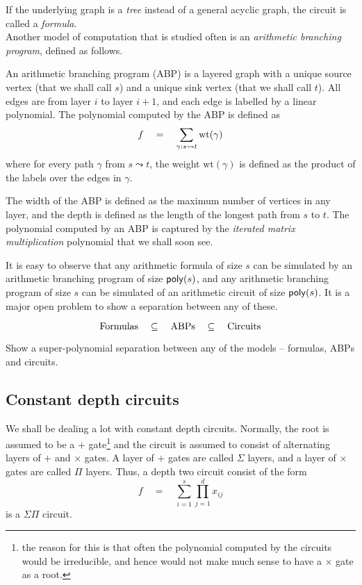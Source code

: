 If the underlying graph is a \emph{tree} instead of a general acyclic graph, the circuit is called a \emph{formula}. \\

Another model of computation that is studied often is an \emph{arithmetic branching program}, defined as follows. 

\begin{definition}\label{defn:ABP}
An arithmetic branching program (ABP) is a layered graph with a unique source vertex (that we shall call $s$) and a unique sink vertex (that we shall call $t$). All edges are from layer $i$ to layer $i+1$, and each edge is labelled by a linear polynomial. The polynomial computed by the ABP is defined as 
\[
f\quad = \quad \sum_{\gamma: s \leadsto t} \mathrm{wt}(\gamma)
\]
where for every path $\gamma$ from $s\leadsto t$, the weight $\mathrm{wt}(\gamma)$ is defined as the product of the labels over the edges in $\gamma$. 
\end{definition}

The width of the ABP is defined as the maximum number of vertices in any layer, and the depth is defined as the length of the longest path from $s$ to $t$. The polynomial computed by an ABP is captured by the \emph{iterated matrix multiplication} polynomial that we shall soon see. 

It is easy to observe that any arithmetic formula of size $s$ can be simulated by an arithmetic branching program of size $\mathsf{poly}(s)$, and any arithmetic branching program of size $s$ can be simulated of an arithmetic circuit of size $\mathsf{poly}(s)$. It is a major open problem to show a separation between any of these. 

\[
\mathrm{Formulas} \quad \subseteq \quad \mathrm{ABPs} \quad \subseteq \quad \mathrm{Circuits}
\]

\begin{openproblem}
Show a super-polynomial separation between any of the models -- formulas, ABPs and circuits. 
\end{openproblem}

\subsection{Constant depth circuits}

We shall be dealing a lot with constant depth circuits. Normally, the root is assumed to be a $+$ gate\footnote{the reason for this is that often the polynomial computed by the circuits would be irreducible, and hence would not make much sense to have a $\times$ gate as a root.} and the circuit is assumed to consist of alternating layers of $+$ and $\times$ gates. A layer of $+$ gates are called $\Sigma$ layers, and a layer of $\times$ gates are called $\Pi$ layers. Thus, a depth two circuit consist of the form 
\[
f\quad = \quad \sum_{i=1}^s \prod_{j=1}^d x_{ij}
\]
is a $\Sigma\Pi$ circuit. 

